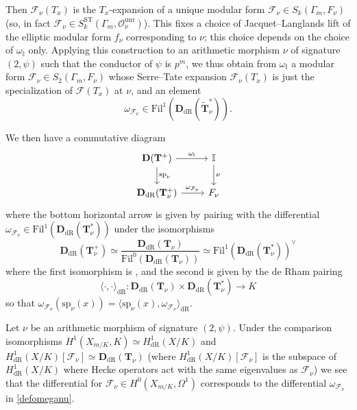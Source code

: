 \documentclass[a4paper,11pt]{amsart}
\numberwithin{equation}{section}
\theoremstyle{plain}
\theoremstyle{definition}
\theoremstyle{remark}
\newcommand{\I}{\mathbb{I}}
\newcommand{\J}{\mathbb{J}}
\newcommand{\unr}{\mathrm{unr}}
\newcommand{\ST}{\mathrm{ST}}
\begin{document}
Then $\mathcal{F}_\nu(T_x)$ is the $T_x$-expansion of a unique modular form $\mathcal{F}_\nu\in S_k(\Gamma_m,F_\nu)$ 
(so, in fact $\mathcal{F}_\nu\in S^\ST_k(\Gamma_m,\mathcal{O}^\unr_\nu)$).  
This fixes a choice of Jacquet--Langlands lift of the elliptic modular form $f_\nu$ corresponding to $\nu$; this choice depends on the choice of $\omega_\I$ only. Applying this construction to an arithmetic morphism $\nu$ of signature $(2,\psi)$ such that the conductor of $\psi$ is $p^m$, we thus obtain from $\omega_\I$ a modular form $\mathcal{F}_\nu\in S_2(\Gamma_m,F_\nu)$ whose Serre--Tate expansion $\mathcal{F}_\nu(T_x)$ is just the specialization of $\boldsymbol{\mathcal{F}}(T_x)$ at $\nu$, and an element 
\begin{equation}\label{defomeganu}
\omega_{\mathcal{F}_\nu}\in \mathrm{Fil}^1(\mathbf{D}_{\mathrm{dR}}(\widetilde{\mathbf{T}}_\nu^*)).\end{equation}

We then have a commutative diagram
\begin{equation}\label{diagramdeRham}
\begin{tikzcd}
\mathbf{D}(\mathbf{T}^+)\arrow{r}{\omega_\I}\arrow{d}{\mathrm{sp}_\nu}&{\I}\arrow{d}{\nu} \\ \mathbf{D}_{\mathrm{dR}}(\mathbf{T}^+_\nu)\arrow{r}{\omega_{\mathcal{F}_\nu}}& F_\nu
\end{tikzcd}
\end{equation}
where the bottom horizontal arrow is given by pairing with the differential 
$
\omega_{\mathcal{F}_\nu}\in \mathrm{Fil}^1(\mathbf{D}_\mathrm{dR}({\mathbf{T}}_\nu^*))$ 
under the isomorphisms
\[\mathbf{D}_{\mathrm{dR}}({\mathbf{T}}^+_{\nu})\simeq \frac{\mathbf{D}_\mathrm{dR}({\mathbf{T}}_\nu)}{\mathrm{Fil}^0(\mathbf{D}_\mathrm{dR}({\mathbf{T}}_\nu))}\simeq
\mathrm{Fil}^1(\mathbf{D}_{\mathrm{dR}}({\mathbf{T}}_\nu^*))^\vee\]
where the first isomorphism is \cite[Lemma 3.2]{Ochiai-Coleman}, and the second is 
given by the de Rham pairing \[\langle\cdot,\cdot\rangle_\mathrm{dR}:\mathbf{D}_\mathrm{dR}({\mathbf{T}}_\nu)\times
\mathbf{D}_\mathrm{dR}({\mathbf{T}}_\nu^*)\longrightarrow K
\] so that 
$\omega_{\mathcal{F}_\nu}(\mathrm{sp}_\nu(x))=\langle \mathrm{sp}_\nu(x),\omega_{\mathcal{F}_\nu}\rangle_\mathrm{dR}$. 

Let $\nu$ be an arithmetic morphism of signature $(2,\psi)$. Under the comparison isomorphisms 
$H^1(X_{m/K},K)\simeq H^1_\mathrm{dR}(X/K)$ and $H^1_\mathrm{dR}(X/K)[\mathcal{F}_\nu]\simeq\mathbf{D}_\mathrm{dR}(\mathbf{T}_\nu)$ 
(where $H^1_\mathrm{dR}(X/K)[\mathcal{F}_\nu]$ is the subspace of $H^1_\mathrm{dR}(X/K)$ where Hecke operators act 
with the same eigenvalues as $\mathcal{F}_\nu$) we see that the differential for $\mathcal{F}_\nu\in H^0(X_{m/K},\Omega^1)$ corresponds to the differential $\omega_{\mathcal{F}_\nu}$ in \eqref{defomeganu}.
\end{document}
